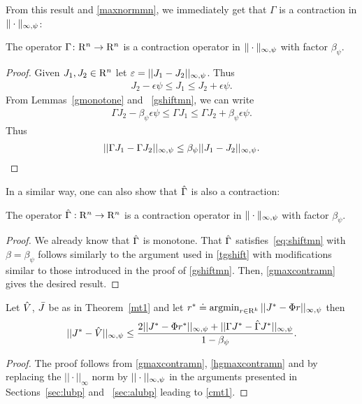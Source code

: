 From this result and \cref{maxnormmn}, we immediately get that $\Gamma$ is a contraction in $\|\cdot\|_{\infty,\psi}$:
\begin{theorem}\label{gmaxcontramn}
The operator $\Gamma  \colon \mathrm{R}^n\rightarrow \mathrm{R}^n$ is a contraction operator in $\|\cdot\|_{\infty,\psi}$ with factor $\beta_{\psi}$.
\end{theorem}
\begin{proof}
Given $J_1,J_2\in \mathrm{R}^n$ let $\varepsilon=||J_1-J_2||_{\infty,\psi}$. Thus
\begin{align}\label{ineq}
J_2-\epsilon\psi\leq J_1\leq J_2+\epsilon \psi.
\end{align}
From Lemmas~\ref{gmonotone} and ~\ref{gshiftmn}, we can write
\begin{align}\label{ineq}
\Gamma J_2-\beta_{\psi} \epsilon\psi\leq \Gamma J_1\leq \Gamma J_2+\beta_{\psi} \epsilon\psi.
\end{align}
Thus
\begin{align}
||\Gamma J_1-\Gamma J_2||_{\infty,\psi}\leq \beta_{\psi} ||J_1-J_2||_{\infty,\psi}.
\end{align}
\end{proof}
\fi
In a similar way, one can also show that $\hat{\Gamma}$ is also a contraction:
\begin{theorem}\label{hgmaxcontramn}
The operator $\hat{\Gamma}:\mathrm{R}^n\to\mathrm{R}^n$  is a contraction operator in $\|\cdot\|_{\infty,\psi}$ with factor $\beta_{\psi}$.
\end{theorem}
\begin{proof}
We already know that $\hat{\Gamma}$ is monotone. That $\hat{\Gamma}$ satisfies~\cref{eq:shiftmn}
with $\beta = \beta_{\psi}$ follows similarly to the argument used in  \cref{tgshift}
with modifications similar to those introduced in the proof of \cref{gshiftmn}.
Then, \cref{gmaxcontramn} gives the desired result.
\end{proof}
\begin{lemma}\label{cmt1mn}
Let $\hat{V}$, $\bar{J}$ be as in Theorem~\ref{mt1} and let $r^*\doteq\operatorname{argmin}_{r\in \mathrm{R}^k}||J^*-\Phi r||_{\infty,\psi}$ then
\begin{align}
||J^*-\hat{V}||_{\infty,\psi}\leq \frac{2||J^*-\Phi r^*||_{\infty,\psi}+||\Gamma J^*-\hat{\Gamma} J^*||_{\infty,\psi}}{1-\beta_{\psi}}.
\end{align}
\end{lemma}
\begin{proof}
The proof follows from \cref{gmaxcontramn}, \cref{hgmaxcontramn} and by replacing the $||\cdot||_\infty$ norm by $||\cdot||_{\infty,\psi}$ in the arguments presented in 
Sections~\ref{sec:lubp} and ~\ref{sec:alubp} leading to \cref{cmt1}.
\end{proof}

